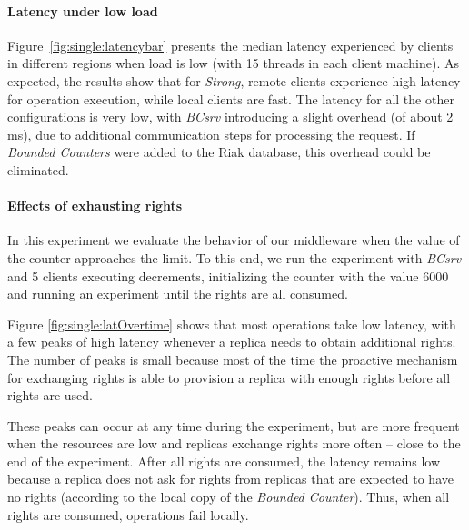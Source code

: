 \documentclass[conference]{IEEEtran}
\newcommand{\InvCounter}{\emph{Bounded Counter}}
\newcommand{\InvCounters}{\emph{Bounded Counters}}
\begin{document}
\paragraph{Latency under low load}
Figure~\ref{fig:single:latencybar} presents the median latency experienced by clients in different
regions when load is low (with 15 threads in each client machine).
As expected, the results show that for \emph{Strong}, remote clients experience high latency 
for operation execution, while local clients are fast.
The latency for all the other configurations is very low, with \emph{BCsrv} introducing a
slight overhead (of about 2 ms), due to additional communication steps for processing the request. 
If \InvCounters{} were added to the Riak database, this overhead could be eliminated. 

 












\paragraph{Effects of exhausting rights}
In this experiment we evaluate the behavior of our middleware when the
value of the counter approaches the limit.
To this end, we run the experiment with \emph{BCsrv} and 5 clients executing  decrements, 
initializing the counter with the value 6000 and running an experiment  
until the rights are all consumed. 

Figure \ref{fig:single:latOvertime} shows that most operations take low latency, with a few 
peaks of high latency whenever a replica needs to obtain additional rights.
The number of peaks is small because most of the time the proactive mechanism 
for exchanging rights is able to provision a replica with enough rights before 
all rights are used. 

These peaks can occur at any time during the experiment, but are more frequent when
the resources are low and replicas exchange rights more often -- close to 
the end of the experiment. 
After all rights are consumed, the latency remains low because a replica 
does not ask for rights from replicas that are expected to have no rights (according
to the local copy of the \InvCounter{}). Thus, when all rights are consumed,
operations fail locally. 
\end{document}
